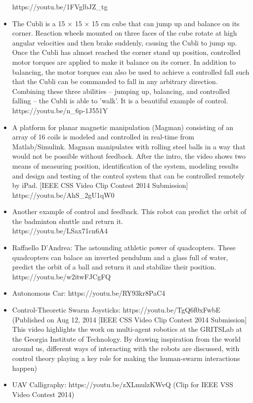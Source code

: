 \documentclass{document}
\begin{document}
\begin{itemize}
			https://youtu.be/1FVglbJZ_tg
			\item The Cubli is a 15 × 15 × 15 cm cube that can jump up and balance on its corner. Reaction wheels mounted on three faces of the cube rotate at high angular velocities and then brake suddenly, causing the Cubli to jump up. Once the Cubli has almost reached the corner stand up position, controlled motor torques are applied to make it balance on its corner. In addition to balancing, the motor torques can also be used to achieve a controlled fall such that the Cubli can be commanded to fall in any arbitrary direction. Combining these three abilities -- jumping up, balancing, and controlled falling -- the Cubli is able to 'walk'. It is a beautiful example of control.\\
			https://youtu.be/n_6p-1J551Y
			\item A platform for planar magnetic manipulation (Magman) consisting of an array of 16 coils is modeled and controlled in real-time from Matlab/Simulink. Magman manipulates with rolling steel balls in a way that would not be possible without feedback. After the intro, the video shows two means of measuring position, identification of the system, modeling results and design and testing of the control system that can be controlled remotely by iPad.
			[IEEE CSS Video Clip Contest 2014 Submission]\\
			https://youtu.be/AhS_2gU1qW0
			\item Another example of control and feedback.
			This robot can predict the orbit of the badminton shuttle and return it.\\
			https://youtu.be/LSax71cn6A4
			\item Raffaello D'Andrea: The astounding athletic power of quadcopters.
			These quadcopters can balace an inverted pendulum and a glass full of water, predict the orbit of a ball and return it and stabilize their position.\\
			https://youtu.be/w2itwFJCgFQ
			\item Autonomous Car: https://youtu.be/RY93kr8PaC4
			\item Control-Theoretic Swarm Joysticks: https://youtu.be/TgQ6f0xFwbE
			(Published on Aug 12, 2014 [IEEE CSS Video Clip Contest 2014 Submission] This video highlights the work on multi-agent robotics at the GRITSLab at the Georgia Institute of Technology. By drawing inspiration from the world around us, different ways of interacting with the robots are discussed, with control theory playing a key role for making the human-swarm interactions happen)
			\item UAV Calligraphy: https://youtu.be/zXLmulzKWvQ
			(Clip for IEEE VSS Video Contest 2014)
		\end{itemize}
\end{document}
